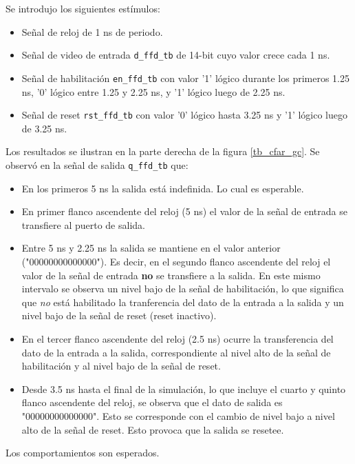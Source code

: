 Se introdujo los siguientes estímulos:
\begin{itemize}
\item Señal de reloj de 1 ns de periodo.
\item Señal de video de entrada \texttt{d\_ffd\_tb} de 14-bit cuyo valor crece cada 1 ns.
\item Señal de habilitación \texttt{en\_ffd\_tb} con valor '1' lógico durante los primeros 1.25 ns, '0' lógico entre 1.25 y 2.25 ns, y '1' lógico luego de 2.25 ns.
\item Señal de reset \texttt{rst\_ffd\_tb} con valor '0' lógico hasta 3.25 ns y '1' lógico luego de 3.25 ns.
\end{itemize}


Los resultados se ilustran en la parte derecha de la figura \ref{tb_cfar_gc}. Se observó en la señal de salida \texttt{q\_ffd\_tb} que:

\begin{itemize}
\item En los primeros 5 ns la salida está indefinida. Lo cual es esperable.
\item En primer flanco ascendente del reloj (5 ns) el valor de la señal de entrada se transfiere al puerto de salida.
\item Entre 5 ns y 2.25 ns la salida se mantiene en el valor anterior ("00000000000000"). Es decir, en el segundo flanco ascendente del reloj el valor de la señal de entrada \textbf{no} se transfiere a la salida. En este mismo intervalo se observa un nivel bajo de la señal de habilitación, lo que significa que \textit{no} está habilitado la tranferencia del dato de la entrada a la salida y un nivel bajo de la señal de reset (reset inactivo).
\item En el tercer flanco ascendente del reloj (2.5 ns) ocurre la transferencia del dato de la entrada a la salida, correspondiente al nivel alto de la señal de habilitación y al nivel bajo de la señal de reset.
\item Desde 3.5 ns hasta el final de la simulación, lo que incluye el cuarto y quinto flanco ascendente del reloj, se observa que el dato de salida es "00000000000000". Esto se corresponde con el cambio de nivel bajo a nivel alto de la señal de reset. Esto provoca que la salida se resetee.
\end{itemize}

Los comportamientos son esperados.